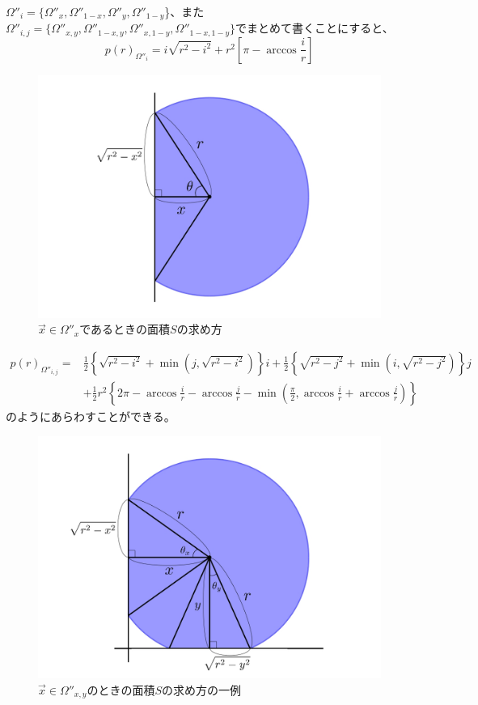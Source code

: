 $\Omega''_{i} = \{\Omega''_{x}, \Omega''_{1-x}, \Omega''_{y}, \Omega''_{1-y}$\}、また$\Omega''_{i,j} = \{\Omega''_{x,y}, \Omega''_{1-x,y}, \Omega''_{x,1-y}, \Omega''_{1-x,1-y}\}$でまとめて書くことにすると、
\[p(r)_{\Omega''_{i}} = i \sqrt{r^{2}-i^{2}} + r^{2} \left[ \pi -\arccos \frac{i}{r} \right]\]
\begin{figure}[H]
    \begin{center}
        \includegraphics[width=12.5cm]{../img/omega_x.jpg}
        \caption{$\vec{x} \in \Omega''_{x}$であるときの面積$S$の求め方}
        \label{fig:f21}
    \end{center}
\end{figure}
\begin{align}p(r)_{\Omega''_{i,j}} = &\frac{1}{2}\left\{ \sqrt{r^{2}-i^{2}} + \min \left(j, \sqrt{r^{2}-i^{2}}\right) \right\}i + \frac{1}{2}\left\{ \sqrt{r^{2}-j^{2}} + \min \left( i, \sqrt{r^{2}-j^{2}}\right) \right\}j \nonumber \\
&+ \frac{1}{2}r^{2} \left\{ 2\pi -\arccos \frac{i}{r}-\arccos \frac{j}{r}-\min \left( \frac{\pi}{2}, \arccos \frac{i}{r} +\arccos \frac{j}{r} \right) \right\}
\end{align}
のようにあらわすことができる。
\begin{figure}[H]
    \begin{center}
        \includegraphics[width=12.5cm]{../img/omega_xy.jpg}
        \caption{$\vec{x} \in \Omega''_{x,y}$のときの面積$S$の求め方の一例}
        \label{fig:f22}
    \end{center}
\end{figure}

